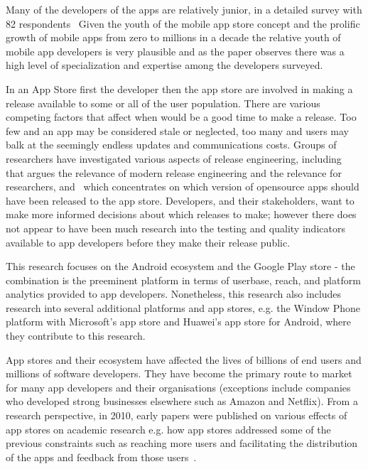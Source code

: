 Many of the developers of the apps are relatively junior, in a detailed survey with 82 respondents~\citep[p. 142 and p.134]{francese2017_mobile_app_development_and_management_results_from_a_quantitative_investigation} Given the youth of the mobile app store concept and the prolific growth of mobile apps from zero to millions in a decade the relative youth of mobile app developers is very plausible and as the paper observes there was a high level of specialization and expertise among the developers surveyed.

In an App Store first the developer then the app store are involved in making a release available to some or all of the user population. There are various competing factors that affect when would be a good time to make a release. Too few and an app may be considered stale or neglected, too many and users may balk at the seemingly endless updates and communications costs. Groups of researchers have investigated various aspects of release engineering, including~\cite{adams2016modern} that argues the relevance of modern release engineering and the relevance for researchers, and~\cite{nayebi2017version} which concentrates on which version of opensource apps should have been released to the app store. Developers, and their stakeholders, want to make more informed decisions about which releases to make; however there does not appear to have been much research into the testing and quality indicators available to app developers before they make their release public.


This research focuses on the Android ecosystem and the Google Play store - the combination is the preeminent platform in terms of userbase, reach, and platform analytics provided to app developers. Nonetheless, this research also includes research into several additional platforms and app stores, e.g. the Window Phone platform with Microsoft's app store and Huawei's app store for Android, where they contribute to this research. %


App stores and their ecosystem have affected the lives of billions of end users and millions of software developers. They have become the primary route to market for many app developers and their organisations (exceptions include companies who developed strong businesses elsewhere such as Amazon and Netflix). 
From a research perspective, in 2010, early papers were published on various effects of app stores on academic research e.g. how app stores addressed some of the previous constraints such as reaching more users and facilitating the distribution of the apps and feedback from those users~\cite{cramer2010_research_in_the_large_app_stores, miluzzo2010research_in_the_app_store_era}. 

